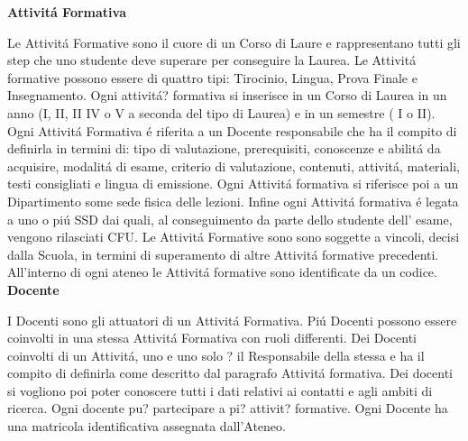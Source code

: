 \documentclass[a4paper,12pt,italian,towside]{article}
\begin{document}
\textbf{Attivit\'a Formativa}
\par
Le Attivit\'a Formative sono il cuore di un Corso di Laure e rappresentano tutti gli step che uno studente deve superare per conseguire la Laurea. Le Attivit\'a formative possono essere di quattro tipi: Tirocinio, Lingua, Prova Finale e Insegnamento. Ogni attivit\'a? formativa si inserisce in un Corso di Laurea in un anno (I, II, II IV o V a seconda del tipo di Laurea) e in un semestre ( I o II). Ogni Attivit\'a Formativa \'e riferita a un Docente responsabile che ha il compito di definirla in termini di: tipo di valutazione, prerequisiti, conoscenze e abilit\'a da acquisire, modalit\'a di esame, criterio di valutazione, contenuti, attivit\'a, materiali, testi consigliati e lingua di emissione. Ogni Attivit\'a formativa si riferisce poi a un Dipartimento some sede fisica delle lezioni. Infine ogni Attivit\'a formativa \'e legata a uno o pi\'u SSD dai quali, al conseguimento da parte dello studente dell' esame, vengono rilasciati CFU. Le Attivit\'a Formative sono sono soggette a vincoli, decisi dalla Scuola, in termini di superamento di altre Attivit\'a formative precedenti. All'interno di ogni ateneo le Attivit\'a formative sono identificate da un codice.\\

\textbf{Docente}
\par
I Docenti sono gli attuatori di un Attivit\'a Formativa. Pi\'u Docenti possono essere coinvolti in una stessa Attivit\'a Formativa con ruoli differenti. Dei Docenti coinvolti di un Attivit\'a, uno e uno solo ? il Responsabile della stessa e ha il compito di definirla come descritto dal paragrafo Attivit\'a formativa. Dei docenti si vogliono poi poter conoscere tutti i dati relativi ai contatti e agli ambiti di ricerca. Ogni docente pu? partecipare a pi? attivit? formative. Ogni Docente ha una matricola identificativa assegnata dall'Ateneo.\\


\newpage
\end{document}
